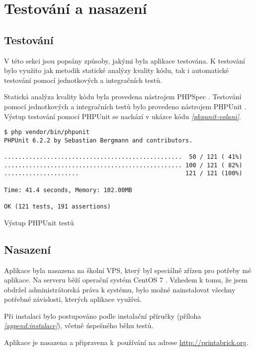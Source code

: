 \chapter{Testování a nasazení}

\section{Testování}
V této sekci jsou popsány způsoby, jakými byla aplikace testována. K testování bylo využito jak metodik statické analýzy kvality kódu, tak i automatické testování pomocí jednotkových a integračních testů.

Statická analýza kvality kódu byla provedena nástrojem PHPSpec \autocite{phpspec}. Testování pomocí jednotkových a integračních testů bylo provedeno nástrojem PHPUnit \autocite{phpunit}.
Výstup testování pomocí PHPUnit se nachází v ukázce kódu \emph{\ref{phpunit-volani}}. 


\begin{listing}[htbp]
        \begin{verbatim}
$ php vendor/bin/phpunit 
PHPUnit 6.2.2 by Sebastian Bergmann and contributors.

..................................................  50 / 121 ( 41%)
.................................................. 100 / 121 ( 82%)
.....................                              121 / 121 (100%)

Time: 41.4 seconds, Memory: 102.00MB

OK (121 tests, 191 assertions)
        \end{verbatim}
    \caption{Výstup PHPUnit testů \label{phpunit-volani}}
\end{listing}





\section{Nasazení}
Aplikace byla nasazena na školní \gls{VPS}, který byl speciálně zřízen pro potřeby mé aplikace. Na serveru běží operační systém CentOS 7 \autocite{centos}. Vzhedem k tomu, že jsem obdržel administrátorská práva k systému, bylo možné nainstalovat všechny potřebné závislosti, kterých aplikace využívá. 

Při instalaci bylo postupováno podle instalační příručky (příloha \emph{\ref{append:instalace}}), včetně úspešného běhu testů. 

Aplikace je nasazena a připravena k~používání na adrese \url{http://printabrick.org}. 



